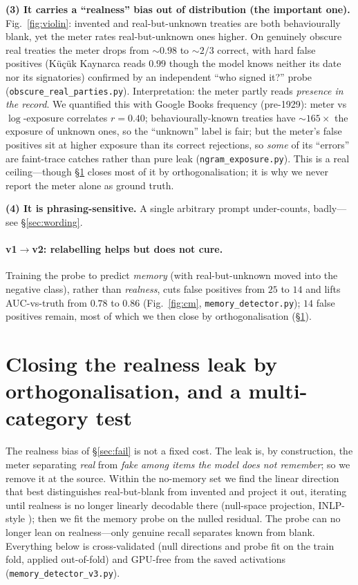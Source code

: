 \documentclass[11pt]{article}
\newcommand{\code}[1]{\texttt{\small #1}}
\begin{document}
\textbf{(3) It carries a ``realness'' bias out of distribution (the important one).} Fig.~\ref{fig:violin}: invented and
real-but-unknown treaties are both behaviourally blank, yet the meter rates real-but-unknown ones higher. On genuinely
obscure real treaties the meter drops from $\sim\!0.98$ to $\sim\!2/3$ correct, with hard false positives
(K\"u\c{c}\"uk Kaynarca reads $0.99$ though the model knows neither its date nor its signatories) confirmed by an
independent ``who signed it?'' probe (\code{obscure\_real\_parties.py}). Interpretation: the meter partly reads
\emph{presence in the record}. We quantified this with Google Books frequency (pre-1929): meter vs
$\log$-exposure correlates $r{=}0.40$; behaviourally-known treaties have $\sim\!165\times$ the exposure of unknown ones,
so the ``unknown'' label is fair; but the meter's false positives sit at higher exposure than its correct rejections,
so \emph{some} of its ``errors'' are faint-trace catches rather than pure leak (\code{ngram\_exposure.py}). This is a
real ceiling---though \S\ref{sec:orthog} closes most of it by orthogonalisation; it is why we never report the meter alone as ground truth.

\textbf{(4) It is phrasing-sensitive.} A single arbitrary prompt under-counts, badly---see \S\ref{sec:wording}.

\paragraph{v1$\to$v2: relabelling helps but does not cure.} Training the probe to predict \emph{memory} (with
real-but-unknown moved into the negative class), rather than \emph{realness}, cuts false positives from $25$ to $14$ and
lifts AUC-vs-truth from $0.78$ to $0.86$ (Fig.~\ref{fig:cm}, \code{memory\_detector.py}); $14$ false positives remain, most of which we then close by orthogonalisation (\S\ref{sec:orthog}).

\section{Closing the realness leak by orthogonalisation, and a multi-category test}\label{sec:orthog}
The realness bias of \S\ref{sec:fail} is not a fixed cost. The leak is, by construction, the meter separating
\emph{real} from \emph{fake} \emph{among items the model does not remember}; so we remove it at the source. Within the
no-memory set we find the linear direction that best distinguishes real-but-blank from invented and project it out,
iterating until realness is no longer linearly decodable there (null-space projection, INLP-style \cite{inlp}); then we
fit the memory probe on the nulled residual. The probe can no longer lean on realness---only genuine recall separates
known from blank. Everything below is cross-validated (null directions and probe fit on the train fold, applied
out-of-fold) and GPU-free from the saved activations (\code{memory\_detector\_v3.py}).
\end{document}
